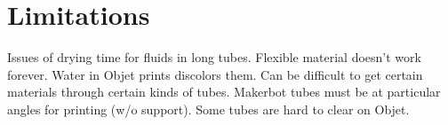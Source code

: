 \section{Limitations}
Issues of drying time for fluids in long tubes.  Flexible material doesn't work forever.  Water in Objet prints discolors them.  Can be difficult to get certain materials through certain kinds of tubes.  Makerbot tubes must be at particular angles for printing (w/o support).  Some tubes are hard to clear on Objet.